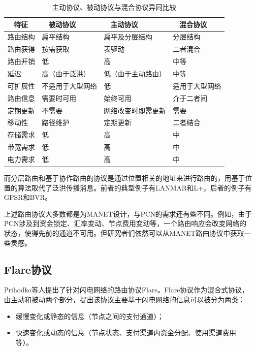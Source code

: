 \documentclass[12pt,a4paper]{article}
\begin{document}
\begin{table}[htb]
\renewcommand\arraystretch{1.2}
\caption{主动协议、被动协议与混合协议异同比较}
\centering
\begin{tabular}{l l l l}
\\
\hline
\hline
~ \textbf{特征} ~ & ~ \textbf{被动协议} ~ & ~ \textbf{主动协议} ~ & ~ \textbf{混合协议} \\[6pt]
\hline
路由结构  & 扁平结构 & 扁平及分层结构 & 分层结构 \\[6pt]
\hline
路由获得 & 按需获取 & 表驱动 & 二者混合
\\[6pt]
\hline
路由开销 & 低 & 高 & 中等
\\[6pt]
\hline
延迟 & 高（由于泛洪） & 低（由于主动路由） & 中等
\\[6pt]
\hline
可扩展性 & 不适用于大型网络 & 低 & 适用于大型网络
\\[6pt]
\hline
路由信息 & 需要时可用 & 始终可用 & 介于二者间
\\[6pt]
\hline
定期更新 & 不需要 & 网络改变时即需更新 & 需要
\\[6pt]
\hline
移动性 & 路径维护 & 定期更新 & 二者结合
\\[6pt]
\hline
存储需求 & 低 & 高 & 中
\\[6pt]
\hline
带宽需求 & 低 & 高 & 中
\\[6pt]
\hline
电力需求 & 低 & 高 & 中
\\[6pt]
\hline
\hline
\end{tabular}
\end{table}

而分层路由和基于协作路由的协议是通过位置相关的地址来进行路由的，用基于位置的算法取代了泛洪传播消息。前者的典型例子有LANMAR\cite{Guangyu}和L+\cite{mitton2005distributed}，后者的例子有GPSR\cite{Karp2000}和BVR\cite{fonseca2005beacon}。

上述路由协议大多数都是为MANET设计，与PCN的需求还有些不同。例如，由于PCN涉及到资金锁定、汇率变动、节点费用变动等，一个路由响应会改变网络的状态，使得先前的通道不可用。但研究者们依然可以从MANET路由协议中获取一些灵感。

\subsection{Flare协议}
Prihodko等人提出了针对闪电网络的路由协议Flare\cite{prihodko2016flare}。Flare协议作为混合式协议，由主动和被动两个部分，提出该协议主要基于闪电网络的信息可以被分为两类：
\begin{itemize}
	\item 缓慢变化或静态的信息（节点之间的支付通道）；
	\item 快速变化或动态的信息（节点状态、支付渠道内资金分配、使用渠道费用等）。
\end{itemize}
\end{document}
